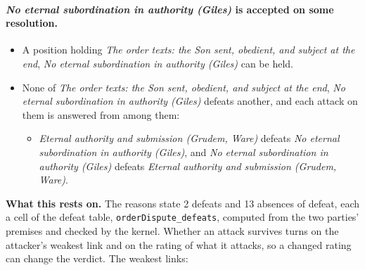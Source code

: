 \documentclass[11pt,paper=\testimonypaper,DIV=13,parskip=false]{scrartcl}
\begin{document}
\paragraph{\emph{No eternal subordination in authority (Giles)} is accepted on some resolution.}
\begin{itemize}
\item A position holding \emph{The order texts: the Son sent, obedient, and subject at the end}, \emph{No eternal subordination in authority (Giles)} can be held.
\item None of \emph{The order texts: the Son sent, obedient, and subject at the end}, \emph{No eternal subordination in authority (Giles)} defeats another, and each attack on them is answered from among them:
\begin{itemize}
\item \emph{Eternal authority and submission (Grudem, Ware)} defeats \emph{No eternal subordination in authority (Giles)}, and \emph{No eternal subordination in authority (Giles)} defeats \emph{Eternal authority and submission (Grudem, Ware)}.
\end{itemize}
\end{itemize}
\par\noindent\textbf{What this rests on.} The reasons state 2 defeats and 13 absences of defeat, each a cell of the defeat table, \texttt{order\allowbreak{}Dispute\_\allowbreak{}defeats}, computed from the two parties' premises and checked by the kernel. Whether an attack survives turns on the attacker's weakest link and on the rating of what it attacks, so a changed rating can change the verdict. The weakest links:
\end{document}
